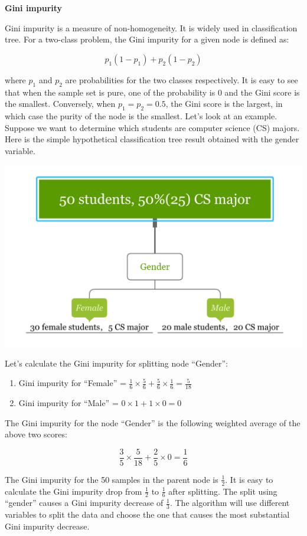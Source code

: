 \documentclass[12pt,]{krantz}
\providecommand{\tightlist}{%
  \setlength{\itemsep}{0pt}\setlength{\parskip}{0pt}}
\begin{document}
\textbf{Gini impurity}

Gini impurity\citep{Breiman1984} is a measure of non-homogeneity. It is widely used in classification tree. For a two-class problem, the Gini impurity for a given node is defined as:

\[p_{1}(1-p_{1})+p_{2}(1-p_{2})\]

where \(p_{1}\) and \(p_{2}\) are probabilities for the two classes respectively. It is easy to see that when the sample set is pure, one of the probability is 0 and the Gini score is the smallest. Conversely, when \(p_{1}=p_{2}=0.5\), the Gini score is the largest, in which case the purity of the node is the smallest. Let's look at an example. Suppose we want to determine which students are computer science (CS) majors. Here is the simple hypothetical classification tree result obtained with the gender variable.

\includegraphics{images/giniEN.PNG}

Let's calculate the Gini impurity for splitting node ``Gender'':

\begin{enumerate}
\def\labelenumi{\arabic{enumi}.}
\tightlist
\item
  Gini impurity for ``Female'' = \(\frac{1}{6}\times\frac{5}{6}+\frac{5}{6}\times\frac{1}{6}=\frac{5}{18}\)
\item
  Gini impurity for ``Male'' = \(0\times1+1\times 0=0\)
\end{enumerate}

The Gini impurity for the node ``Gender'' is the following weighted average of the above two scores:

\[\frac{3}{5}\times\frac{5}{18}+\frac{2}{5}\times 0=\frac{1}{6}\]

The Gini impurity for the 50 samples in the parent node is \(\frac{1}{2}\). It is easy to calculate the Gini impurity drop from \(\frac{1}{2}\) to \(\frac{1}{6}\) after splitting. The split using ``gender'' causes a Gini impurity decrease of \(\frac{1}{3}\). The algorithm will use different variables to split the data and choose the one that causes the most substantial Gini impurity decrease.
\end{document}
